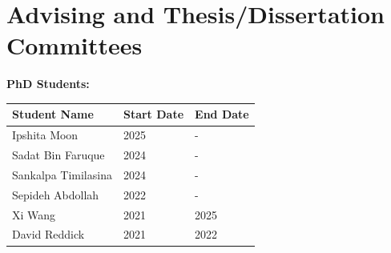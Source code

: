 \section{Advising and Thesis/Dissertation Committees}

\textbf{PhD Students:}
\begin{table}[!ht]
    \centering
    \begin{tabular}{|l|l|l|}
    \hline
    Student Name & Start Date & End Date \\ \hline
    Ipshita Moon & 2025 & - \\ \hline
    Sadat Bin Faruque & 2024 & - \\ \hline
    Sankalpa Timilasina & 2024 & - \\ \hline
    Sepideh Abdollah & 2022 & - \\ \hline
    Xi Wang & 2021 & 2025 \\ \hline
    David Reddick & 2021 & 2022 \\ \hline    
    \end{tabular}
\end{table}

        
  

